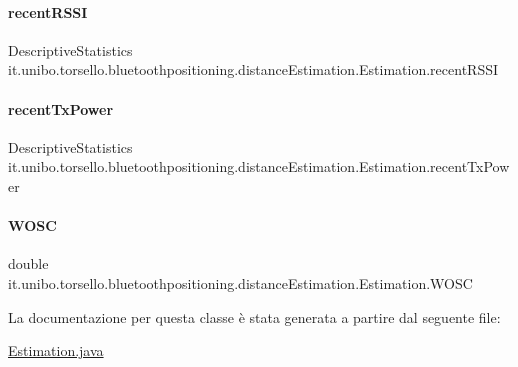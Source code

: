 \paragraph{\texorpdfstring{recent\+R\+S\+SI}{recentRSSI}}
{\footnotesize\ttfamily Descriptive\+Statistics it.\+unibo.\+torsello.\+bluetoothpositioning.\+distance\+Estimation.\+Estimation.\+recent\+R\+S\+SI\hspace{0.3cm}{\ttfamily [private]}}

\hypertarget{classit_1_1unibo_1_1torsello_1_1bluetoothpositioning_1_1distanceEstimation_1_1Estimation_a4258d96e807fa104223635ecb7ddc940_a4258d96e807fa104223635ecb7ddc940}{}\label{classit_1_1unibo_1_1torsello_1_1bluetoothpositioning_1_1distanceEstimation_1_1Estimation_a4258d96e807fa104223635ecb7ddc940_a4258d96e807fa104223635ecb7ddc940} 
\paragraph{\texorpdfstring{recent\+Tx\+Power}{recentTxPower}}
{\footnotesize\ttfamily Descriptive\+Statistics it.\+unibo.\+torsello.\+bluetoothpositioning.\+distance\+Estimation.\+Estimation.\+recent\+Tx\+Power\hspace{0.3cm}{\ttfamily [private]}}

\hypertarget{classit_1_1unibo_1_1torsello_1_1bluetoothpositioning_1_1distanceEstimation_1_1Estimation_a53237b14bc1d27ae4f751b02d798b595_a53237b14bc1d27ae4f751b02d798b595}{}\label{classit_1_1unibo_1_1torsello_1_1bluetoothpositioning_1_1distanceEstimation_1_1Estimation_a53237b14bc1d27ae4f751b02d798b595_a53237b14bc1d27ae4f751b02d798b595} 
\paragraph{\texorpdfstring{W\+O\+SC}{WOSC}}
{\footnotesize\ttfamily double it.\+unibo.\+torsello.\+bluetoothpositioning.\+distance\+Estimation.\+Estimation.\+W\+O\+SC\hspace{0.3cm}{\ttfamily [private]}}



La documentazione per questa classe è stata generata a partire dal seguente file\+:\begin{DoxyCompactItemize}
\item 
\hyperlink{Estimation_8java}{Estimation.\+java}\end{DoxyCompactItemize}
